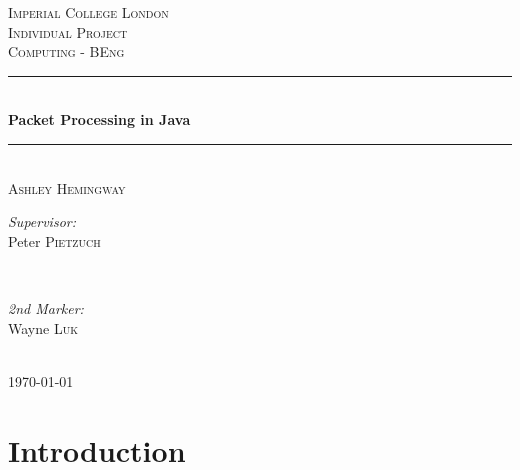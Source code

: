 \documentclass[a4paper, titlepage]{article}
\begin{document}
\begin{titlepage}

\newcommand{\HRule}{\rule{\linewidth}{0.5mm}}

\center

\textsc{\LARGE Imperial College London}\\[1.5cm]
\textsc{\Large Individual Project}\\[0.5cm]
\textsc{\large Computing - BEng}\\[0.5cm]

\HRule \\[0.6cm]
{ \huge \bfseries Packet Processing in Java}\\[0.4cm]
\HRule \\[1.5cm]

\textsc{\LARGE Ashley Hemingway}\\[1.5cm]

\begin{minipage}{0.4\textwidth}
\begin{flushleft} \large
\emph{Supervisor:}\\
Peter \textsc{Pietzuch}
\end{flushleft}
\end{minipage}
~
\begin{minipage}{0.4\textwidth}
\begin{flushright} \large
\emph{2nd Marker:} \\
Wayne \textsc{Luk}
\end{flushright}
\end{minipage}\\[4cm]

{\large \monthyeardate\today}\\[3cm]


\vfill

\end{titlepage}


\listoftodos

\newpage

\tableofcontents

\newpage

\section{Introduction}
\end{document}

